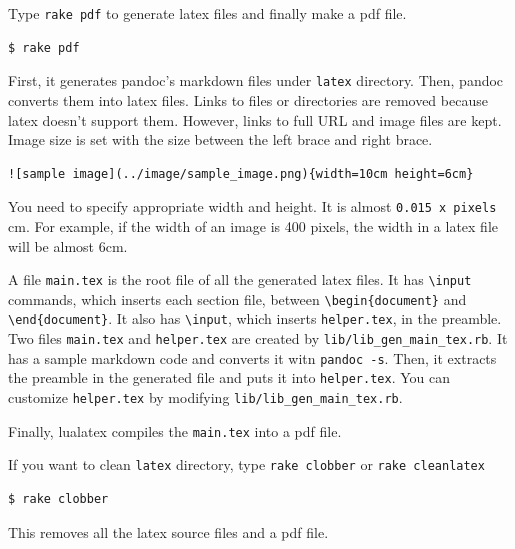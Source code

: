 Type \texttt{rake\ pdf} to generate latex files and finally make a pdf
file.

\begin{verbatim}
$ rake pdf
\end{verbatim}

First, it generates pandoc's markdown files under \texttt{latex}
directory. Then, pandoc converts them into latex files. Links to files
or directories are removed because latex doesn't support them. However,
links to full URL and image files are kept. Image size is set with the
size between the left brace and right brace.

\begin{verbatim}
![sample image](../image/sample_image.png){width=10cm height=6cm}
\end{verbatim}

You need to specify appropriate width and height. It is almost
\texttt{0.015\ x\ pixels} cm. For example, if the width of an image is
400 pixels, the width in a latex file will be almost 6cm.

A file \texttt{main.tex} is the root file of all the generated latex
files. It has \texttt{\textbackslash{}input} commands, which inserts
each section file, between \texttt{\textbackslash{}begin\{document\}}
and \texttt{\textbackslash{}end\{document\}}. It also has
\texttt{\textbackslash{}input}, which inserts \texttt{helper.tex}, in
the preamble. Two files \texttt{main.tex} and \texttt{helper.tex} are
created by \texttt{lib/lib\_gen\_main\_tex.rb}. It has a sample markdown
code and converts it witn \texttt{pandoc\ -s}. Then, it extracts the
preamble in the generated file and puts it into \texttt{helper.tex}. You
can customize \texttt{helper.tex} by modifying
\texttt{lib/lib\_gen\_main\_tex.rb}.

Finally, lualatex compiles the \texttt{main.tex} into a pdf file.

If you want to clean \texttt{latex} directory, type
\texttt{rake\ clobber} or \texttt{rake\ cleanlatex}

\begin{verbatim}
$ rake clobber
\end{verbatim}

This removes all the latex source files and a pdf file.
